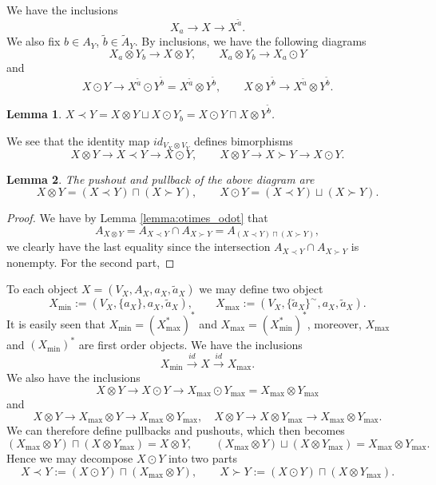 \documentclass[12pt]{article}
\newtheorem{lemma}{Lemma}
\theoremstyle{definition}
\theoremstyle{remark}
\begin{document}
We have 
the inclusions 
\[
X_a\to X\to X^{\tilde a}.
\]
We also fix $b\in A_Y$, $\tilde b\in \tilde A_Y$. By inclusions, we have the following diagrams
\[
X_a\otimes Y_b\to X\otimes Y,\qquad X_a\otimes Y_b\to  X_a\odot Y
\]
and
\[
X\odot Y\to X^{\tilde a}\odot Y^{\tilde b}=X^{\tilde
a}\otimes Y^{\tilde b},\qquad X\otimes Y^{\tilde b}\to X^{\tilde a}\otimes Y^{\tilde b}.
\]


\begin{lemma}\label{lemma:minmax}
$X\prec Y=X\otimes Y\sqcup X\odot Y_b=X\odot Y \sqcap X\otimes Y^{\tilde b}$.
\end{lemma}


We see that  the identity map $id_{V_X\otimes V_Y}$ defines bimorphisms
\[
X\otimes Y \to X\prec Y\to X\odot Y,\qquad X\otimes Y\to X\succ Y\to X\odot Y.
\]

\begin{lemma}\label{lemma:precsucc_pushpul} The  pushout and pullback of the above
diagram are
\[
X\otimes Y=(X\prec Y)\sqcap (X\succ Y),\qquad X\odot Y= (X\prec Y)\sqcup (X\succ Y).
\]

\end{lemma}

\begin{proof}  We have by Lemma \ref{lemma:otimes_odot} that 
\[
A_{X\otimes Y}=A_{X\prec Y}\cap A_{X\succ Y}=A_{(X\prec Y)\sqcap (X\succ Y)},
\]
we clearly have the last equality since the intersection $A_{X\prec Y}\cap A_{X\succ Y}$
is nonempty. For the second part,   


\end{proof}





To each object $X=(V_X,A_X,a_X,\tilde a_X)$ we may define two object
\[
X_{\min}:=(V_X,\{a_X\},a_X,\tilde a_X),\qquad X_{\max}:=(V_X,\{\tilde a_X\}^\sim,a_X,\tilde a_X). 
\]
It is easily seen that $X_{\min}=(X^*_{\max})^*$ and $X_{\max}=(X^*_{\min})^*$, moreover,
$X_{\max}$ and $(X_{\min})^*$ are first order objects. We have the inclusions
\[
X_{\min}\xrightarrow{id} X\xrightarrow{id} X_{\max}.
\]
We also have the inclusions
\[
X\otimes Y\to X\odot Y \to X_{\max}\odot Y_{\max}=X_{\max}\otimes Y_{\max}
\]
and
\[
X\otimes Y \to X_{\max}\otimes Y\to X_{\max}\otimes Y_{\max}, \quad X\otimes Y \to X\otimes Y_{\max}\to X_{\max}\otimes Y_{\max}.
\]
We can therefore define pullbacks and pushouts,  which then becomes
\[
(X_{\max}\otimes Y)\sqcap (X\otimes Y_{\max})=X\otimes Y,\qquad (X_{\max}\otimes Y)\sqcup
(X\otimes Y_{\max})=X_{\max}\otimes Y_{\max}.
\]
Hence we may decompose $X\odot Y$ into two parts
\[
X\prec Y:= (X\odot Y)\sqcap (X_{\max}\otimes Y),\qquad X\succ Y:=(X\odot Y) \sqcap
(X\otimes  Y_{\max}).
\]
\end{document}
